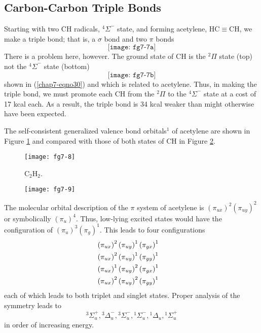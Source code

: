 \subsection{Carbon-Carbon Triple Bonds}

Starting with two CH radicals, ${^4\Sigma}^-$ state, and forming
acetylene, HC$\equiv$CH, we make a triple bond; that is, a $\sigma$
bond and two $\pi$ bonds
\begin{equation}
\texttt{[image: fg7-7a]}
\label{chap7-eqno30}
\end{equation}
There is a problem here, however.  The ground state of CH is the 
${^2\Pi}$ state (top) not the ${^4\Sigma}^-$ state (bottom)
\begin{equation}
\texttt{[image: fg7-7b]}
\label{chap7-eqno32}
\end{equation}
shown in (\ref{chap7-eqno30}) and which is related to acetylene.
Thus, in making the triple bond, we must promote each CH from the
${^2\Pi}$ to the ${^4\Sigma}^-$ state at a cost of 17 kcal each.  As a
result, the triple bond is 34 kcal weaker than might otherwise have
been expected.

The self-consistent generalized valence bond orbitals$^1$ of acetylene
are shown in Figure \ref{chap7-fig8} and compared with those of both
states of CH in Figure \ref{chap7-fig9}.

\begin{figure}
\texttt{[image: fg7-8]}
\caption{C$_2$H$_2$.}
\label{chap7-fig8}
\end{figure}

\begin{figure}
\texttt{[image: fg7-9]}
\caption{}
\label{chap7-fig9}
\end{figure}

The molecular orbital description of the $\pi$ system of acetylene 
is $(\pi_{ux})^2(\pi_{uy})^2$ or symbolically $(\pi_u)^4$.
Thus, low-lying excited states would have the configuration of
$(\pi_u)^3(\pi_g)^1$.  This leads to four configurations
\begin{eqnarray}
\left( \pi_{ux} \right)^2 & \left( \pi_{uy} \right)^1 \left( 
\pi_{gx} \right)^1\cr
\left( \pi_{ux} \right)^2 & \left( \pi_{uy} \right)^1 \left( 
\pi_{gy} \right)^1\cr
\left( \pi_{ux} \right)^1 & \left( \pi_{uy} \right)^2 \left( 
\pi_{gx} \right)^1\cr
\left( \pi_{ux} \right)^2 & \left( \pi_{uy} \right)^2 \left( 
\pi_{gy} \right)^1
\label{chap07-eqno33}
\end{eqnarray}
each of which leads to both triplet and singlet states.  Proper analysis of
the symmetry leads to
\begin{equation}
{^3\Sigma}^+_u , {^3\Delta}^-_u , {^3\Sigma}^-_u , {^1\Sigma}^-_u , 
{^1\Delta}_u , {^1\Sigma}^+_u
\label{chap07-eqno34}
\end{equation}
in order of increasing energy.

